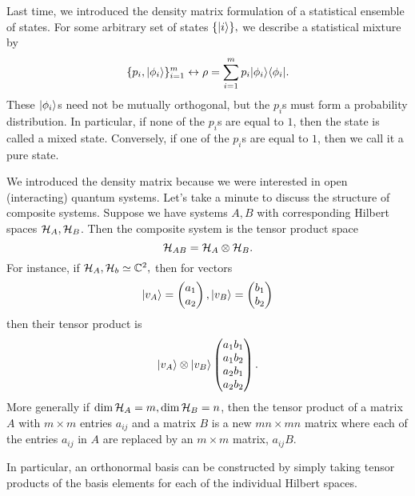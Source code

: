 Last time, we introduced the density matrix formulation of a statistical ensemble of states. For some arbitrary set of states $\{\lvert i\rangle\},$ we describe a statistical mixture by
\begin{equation}
    \{p_i,\lvert\phi_i\rangle\}_{i=1}^m \leftrightarrow \rho =\sum_{i=1}^m p_i \lvert\phi_i\rangle\langle\phi_i\rvert.
\end{equation}
These $\lvert\phi_i\rangle$s need not be mutually orthogonal, but the $p_i$s must form a probability distribution. In particular, if none of the $p_i$s are equal to $1$, then the state is called a mixed state. Conversely, if one of the $p_i$s are equal to $1$, then we call it a pure state.

We introduced the density matrix because we were interested in open (interacting) quantum systems. Let's take a minute to discuss the structure of composite systems. Suppose we have systems $A,B$ with corresponding Hilbert spaces $\mathcal H_A,\mathcal H_B$. Then the composite system is the tensor product space
\begin{equation}
    \mathcal H_{AB}=\mathcal H_{A} \otimes \mathcal H_B.
\end{equation}
For instance, if $\mathcal H_A,\mathcal H_b \simeq \mathbb{C}^2,$ then for vectors
\begin{equation*}
    \lvert v_A\rangle=\begin{pmatrix} a_1 \\ a_2
    \end{pmatrix},
    \lvert v_B\rangle=\begin{pmatrix} b_1 \\ b_2
    \end{pmatrix}
\end{equation*}
then their tensor product is
\begin{equation*}
    \lvert v_A\rangle\otimes \lvert v_B\rangle \begin{pmatrix} a_1b_1 \\ a_1 b_2 \\ a_2b_1 \\ a_2b_2
    \end{pmatrix}.
\end{equation*}
%
More generally if $\dim \mathcal H_A =m, \dim\mathcal H_B=n$, then the tensor product of a matrix $A$ with $m\times m$ entries $a_{ij}$ and a matrix $B$ is a new $mn\times mn$ matrix where each of the entries $a_{ij}$ in $A$ are replaced by an $m\times m$ matrix, $a_{ij} B$.

In particular, an orthonormal basis can be constructed by simply taking tensor products of the basis elements for each of the individual Hilbert spaces.

